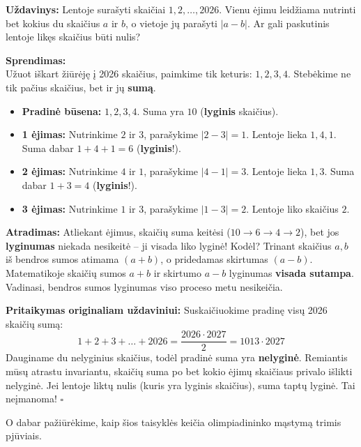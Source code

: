\documentclass[11pt,a4paper]{scrartcl}
\newenvironment{solution}
    {\begin{list}{}{\setlength{\leftmargin}{10pt}\setlength{\rightmargin}{10pt}}\item[]}
    {\end{list}}
\begin{document}
\begin{example}
\textbf{Uždavinys:} Lentoje surašyti skaičiai $1, 2, \ldots, 2026$. Vienu ėjimu leidžiama nutrinti bet kokius du skaičius $a$ ir $b$, o vietoje jų parašyti $|a-b|$. Ar gali paskutinis lentoje likęs skaičius būti nulis?
\end{example}

\begin{solution}
\textbf{Sprendimas:}\\
Užuot iškart žiūrėję į 2026 skaičius, paimkime tik keturis: $1, 2, 3, 4$. Stebėkime ne tik pačius skaičius, bet ir jų \textbf{sumą}.
\begin{itemize}
    \item \textbf{Pradinė būsena:} $1, 2, 3, 4$. Suma yra $10$ (\textbf{lyginis} skaičius).
    \item \textbf{1 ėjimas:} Nutrinkime $2$ ir $3$, parašykime $|2-3| = 1$. Lentoje lieka $1, 4, 1$. Suma dabar $1+4+1 = 6$ (\textbf{lyginis}!).
    \item \textbf{2 ėjimas:} Nutrinkime $4$ ir $1$, parašykime $|4-1| = 3$. Lentoje lieka $1, 3$. Suma dabar $1+3 = 4$ (\textbf{lyginis}!).
    \item \textbf{3 ėjimas:} Nutrinkime $1$ ir $3$, parašykime $|1-3| = 2$. Lentoje liko skaičius $2$. 
\end{itemize}

\textbf{Atradimas:} Atliekant ėjimus, skaičių suma keitėsi ($10 \to 6 \to 4 \to 2$), bet jos \textbf{lyginumas} niekada nesikeitė – ji visada liko lyginė! 
Kodėl? Trinant skaičius $a, b$ iš bendros sumos atimama $(a+b)$, o pridedamas skirtumas $(a-b)$. Matematikoje skaičių sumos $a+b$ ir skirtumo $a-b$ lyginumas \textbf{visada sutampa}. Vadinasi, bendros sumos lyginumas viso proceso metu nesikeičia.

\textbf{Pritaikymas originaliam uždaviniui:} 
Suskaičiuokime pradinę visų 2026 skaičių sumą:
\[ 1+2+3+\ldots+2026 = \frac{2026 \cdot 2027}{2} = 1013 \cdot 2027 \]
Dauginame du nelyginius skaičius, todėl pradinė suma yra \textbf{nelyginė}.
Remiantis mūsų atrastu invariantu, skaičių suma po bet kokio ėjimų skaičiaus privalo išlikti nelyginė. Jei lentoje liktų nulis (kuris yra lyginis skaičius), suma taptų lyginė. Tai neįmanoma! \hfill $\square$
\end{solution}

O dabar pažiūrėkime, kaip šios taisyklės keičia olimpiadininko mąstymą trimis pjūviais.

\end{document}
